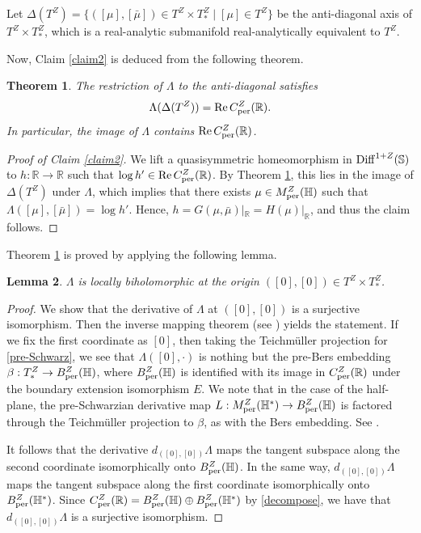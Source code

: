 \documentclass[amstex]{amsart}
\newtheorem{theorem}{Theorem}[section]
\newtheorem{lemma}[theorem]{Lemma}
\theoremstyle{definition}
\theoremstyle{remark}
\numberwithin{equation}{section}
\begin{document}
Let $\Delta(T^Z)=\{([\mu],[\bar \mu]) \in T^Z \times T^Z_* \mid [\mu] \in T^Z\}$ be the anti-diagonal axis of $T^Z \times T^Z_*$,
which is a real-analytic submanifold real-analytically equivalent to $T^Z$. 

Now, Claim \ref{claim2} is deduced from the following theorem. 

\begin{theorem}\label{real}
The restriction of $\Lambda$ to the anti-diagonal satisfies
$$
 \Lambda(\Delta(T^Z))
 = {\rm Re}\,C^Z_{\rm per}(\mathbb R).
$$
In particular, the image of $\Lambda$ contains
${\rm Re}\,C^Z_{\rm per}(\mathbb R)$.
\end{theorem}


\begin{proof}[Proof of Claim \ref{claim2}]
We lift a quasisymmetric homeomorphism in ${\rm Diff}^{1+Z}(\mathbb S)$ to $h:\mathbb R \to \mathbb R$
such that $\log h' \in {\rm Re}\,C^Z_{\rm per}(\mathbb R)$. By Theorem \ref{real}, this lies in the image of $\Delta(T^Z)$
under $\Lambda$,
which implies that there exists $\mu \in M^Z_{\rm per}(\mathbb H)$ such that $\Lambda([\mu],[\bar \mu])=\log h'$.
Hence, $h=G(\mu,\bar \mu)|_{\mathbb R}=H(\mu)|_{\mathbb R}$, and thus the claim follows.
\end{proof}

Theorem \ref{real} is proved by applying the following lemma.

\begin{lemma}\label{origin}
$\Lambda$ is locally biholomorphic at the origin $([0],[0]) \in T^Z \times T^Z_*$.
\end{lemma}

\begin{proof}
We show that the derivative of $\Lambda$ at $([0],[0])$ is a surjective isomorphism.
Then the inverse mapping theorem (see \cite[\S 7.18]{Ch}) yields the statement.
If we fix the first coordinate as $[0]$, then taking the Teichm\"uller projection for \eqref{pre-Schwarz}, we see that
$\Lambda([0],\cdot)$ is nothing but
the pre-Bers embedding $\beta:T^Z_* \to B^Z_{\rm per}(\mathbb H)$, where $B^Z_{\rm per}(\mathbb H)$ is identified
with its image in $C^Z_{\rm per}(\mathbb R)$ under the boundary extension isomorphism $E$. 
We note that in the case of the half-plane, the pre-Schwarzian derivative map 
$L:M^Z_{\rm per}(\mathbb H^*) \to B^Z_{\rm per}(\mathbb H)$ is factored through the Teichm\"uller projection to $\beta$,
as with the Bers embedding. See \cite[Section 7]{WM-4}.

It follows that
the derivative $d_{([0],[0])}\Lambda$ maps the tangent subspace along the second coordinate isomorphically 
onto $B^Z_{\rm per}(\mathbb H)$.
In the same way, $d_{([0],[0])}\Lambda$ maps the tangent subspace along the first coordinate isomorphically
onto $B^Z_{\rm per}(\mathbb H^*)$. Since $C^Z_{\rm per}(\mathbb R)=B^Z_{\rm per}(\mathbb H) \oplus B^Z_{\rm per}(\mathbb H^*)$
by \eqref{decompose}, we have that $d_{([0],[0])}\Lambda$ is a surjective isomorphism.
\end{proof}
\end{document}
